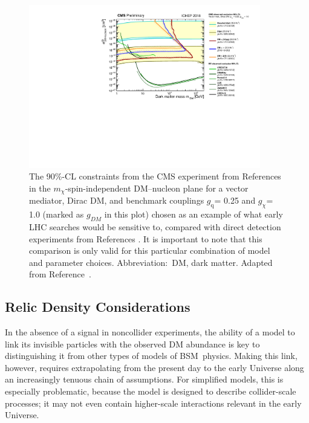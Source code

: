 \documentclass{ar-1col}
\newcommand{\chiDM}{\ensuremath{\chi}\xspace}
\newcommand{\IP}{invisible particle}
\newcommand{\gDM}{\ensuremath{g_{\chiDM}}\xspace}
\newcommand{\gdm}{\gDM}
\newcommand{\gq}{$g_{\mathrm{q}}$\xspace}
\newcommand{\mdm}{\ensuremath{m_{\chiDM}}\xspace}
\begin{document}
{\begin{figure}[!htpb]
\includegraphics[width=0.9\textwidth]{figures/SI_CMSDD_Summary}
\caption{The 90\%-CL constraints from the CMS experiment 
from References \cite{Sirunyan:2017nvi,Sirunyan:2018xlo,Sirunyan:2017jix,CMS-PAS-EXO-16-053,Sirunyan:2017qfc}
in the \mdm-spin-independent DM--nucleon plane for a vector mediator,
Dirac DM, and benchmark couplings \gq = 0.25 and \gdm = 1.0 (marked as $g_{DM}$ in this plot) chosen as an example of what
early LHC searches would be sensitive to, compared with direct detection
experiments from References \cite{Angloher:2015ewa,Agnese:2015nto,Cui:2017nnn,Akerib:2016vxi,Aprile:2018dbl}. 
It is important to note that this comparison is only valid for this particular
combination of model and parameter choices. 
Abbreviation:\ DM, dark matter. Adapted from Reference~.} \label{fig:SICMS}
\end{figure}

\subsection{Relic Density Considerations}

In the absence of a signal in noncollider experiments, the ability of a
model to link its {\IP}s with the observed DM abundance is key to
distinguishing it from other types of models of BSM\ physics. Making this link, however, requires extrapolating
from the present day to the early Universe along an increasingly
tenuous chain of assumptions. For simplified models, this is
especially problematic, because the model is designed to describe
collider-scale processes; it may not even contain higher-scale interactions
relevant in the early Universe. 



}
\end{document}
